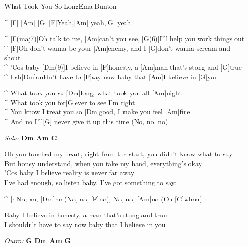 \begin{song}{What Took You So Long}{Ema Bunton}

\vspace{-0.7cm}
\begin{guitar}
^ [F]  [Am]   [G]  [F]Yeah,[Am] yeah,[G] yeah\\
\end{guitar}

\begin{guitar}
^ [F(maj7)]Oh talk to me, [Am]can't you see, [G(6)]I'll help you work things out\\
^ [F]Oh don't wanna be your [Am]enemy, and I [G]don't wanna scream and shout\\
^ 'Cos baby [Dm(9)]I believe in [F]honesty, a [Am]man that's stong and [G]true\\
^ I sh[Dm]ouldn't have to [F]say now baby that [Am]I believe in [G]you\\
\end{guitar}

\begin{guitar}
^ What took you so [Dm]long, what took you all [Am]night\\
^ What took you for[G]ever to see I'm right\\
^ You know I treat you so [Dm]good, I make you feel [Am]fine\\
^ And no I'll[G] never give it up this time (No, no, no)\\
\end{guitar}

\emph{Solo:} \textbf{Dm Am G}

\begin{guitar}
Oh you touched my heart, right from the start, you didn't know what to say\\
But honey understand, when you take my hand, everything's okay\\
'Cos baby I believe reality is never far away\\
I've had enough, so listen baby, I've got something to say:\\
\end{guitar}


\begin{guitar}
^ |: No, no, [Dm]no (No, no, [F]no), No, no, [Am]no  (Oh [G]whoa) :|\\
\end{guitar}

\begin{guitar}
Baby I believe in honesty, a man that's stong and true\\
I shouldn't have to say now baby that I believe in you\\
\end{guitar}


\emph{Outro:} \textbf{G Dm Am G}

\end{song}

